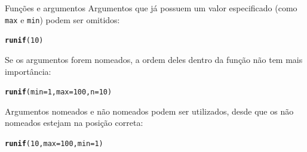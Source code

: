 \documentclass[10pt,handout]{beamer}\usepackage[]{graphicx}\usepackage[]{color}
\makeatletter
\newcommand{\hlnum}[1]{\textcolor[rgb]{0.686,0.059,0.569}{#1}}%
\newcommand{\hlstd}[1]{\textcolor[rgb]{0.345,0.345,0.345}{#1}}%
\newcommand{\hlkwc}[1]{\textcolor[rgb]{0.333,0.667,0.333}{#1}}%
\newcommand{\hlkwd}[1]{\textcolor[rgb]{0.737,0.353,0.396}{\textbf{#1}}}%
\newenvironment{kframe}{%
 \def\at@end@of@kframe{}%
 \ifinner\ifhmode%
  \def\at@end@of@kframe{\end{minipage}}%
  \begin{minipage}{\columnwidth}%
 \fi\fi%
 \def\FrameCommand##1{\hskip\@totalleftmargin \hskip-\fboxsep
 \colorbox{shadecolor}{##1}\hskip-\fboxsep
     \hskip-\linewidth \hskip-\@totalleftmargin \hskip\columnwidth}%
 \MakeFramed {\advance\hsize-\width
   \@totalleftmargin\z@ \linewidth\hsize
   \@setminipage}}%
 {\par\unskip\endMakeFramed%
 \at@end@of@kframe}
\newenvironment{knitrout}{}{} %
\makeatother
\begin{document}
\begin{frame}[fragile]{Funções e argumentos}
Argumentos que já possuem um valor especificado (como \texttt{max} e
\texttt{min}) podem ser omitidos:
\begin{knitrout}\small
{}\color{fgcolor}\begin{kframe}
\begin{alltt}
\hlkwd{runif}\hlstd{(}\hlnum{10}\hlstd{)}
\end{alltt}
\end{kframe}
\end{knitrout}
Se os argumentos forem nomeados, a ordem deles dentro da função não tem
mais importância:
\begin{knitrout}\small
{}\color{fgcolor}\begin{kframe}
\begin{alltt}
\hlkwd{runif}\hlstd{(}\hlkwc{min} \hlstd{=} \hlnum{1}\hlstd{,} \hlkwc{max} \hlstd{=} \hlnum{100}\hlstd{,} \hlkwc{n} \hlstd{=} \hlnum{10}\hlstd{)}
\end{alltt}
\end{kframe}
\end{knitrout}
Argumentos nomeados e não nomeados podem ser utilizados, desde que os
não nomeados estejam na posição correta:
\begin{knitrout}\small
{}\color{fgcolor}\begin{kframe}
\begin{alltt}
\hlkwd{runif}\hlstd{(}\hlnum{10}\hlstd{,} \hlkwc{max} \hlstd{=} \hlnum{100}\hlstd{,} \hlkwc{min} \hlstd{=} \hlnum{1}\hlstd{)}
\end{alltt}
\end{kframe}
\end{knitrout}
\end{frame}
\end{document}
